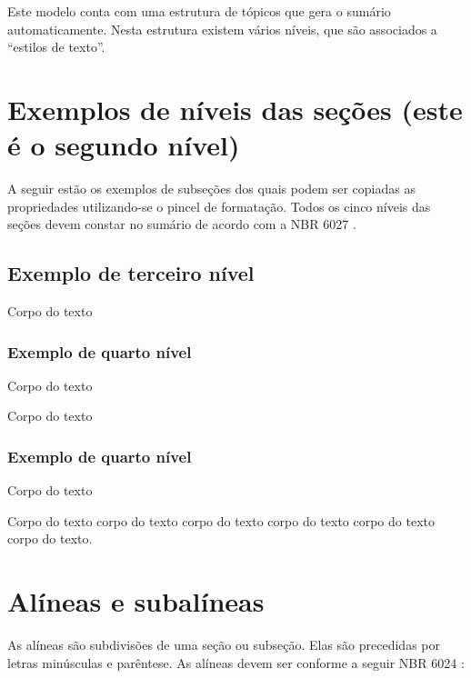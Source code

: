 \documentclass[
        oneside,      %
        english,			
        brazil			 
        ]{configcefetmglpd}
\begin{document}
Este modelo conta com uma estrutura de tópicos que gera o sumário automaticamente. Nesta estrutura existem vários níveis, que são associados a “estilos de texto”.

\section{Exemplos de níveis das seções (este é o segundo nível)} %
\label{sec:exemplos_niveis_secao}
A seguir estão os exemplos de subseções dos quais podem ser copiadas as propriedades utilizando-se o pincel de formatação. 
Todos os cinco níveis das seções devem constar no sumário de acordo com a NBR 6027 \cite{bib:abnt6024}.

\subsection{Exemplo de terceiro nível} %
Corpo do texto

\subsubsection{Exemplo de quarto nível} %
Corpo do texto

Corpo do texto

\subsubsection{Exemplo de quarto nível}
Corpo do texto

Corpo do texto corpo do texto corpo do texto corpo do texto corpo do texto corpo do texto.

\section{Alíneas e subalíneas} \label{sec:alineas_subalineas}
As alíneas são subdivisões de uma seção ou subseção. Elas são precedidas por letras minúsculas e parêntese. 
As alíneas devem ser conforme a seguir NBR 6024 \cite{bib:abnt6024}:
\end{document}
